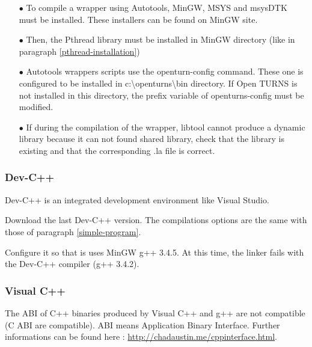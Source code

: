 \documentclass[11pt]{article}
\begin{document}
\begin{itemize}
\item[$\bullet$]   To compile a wrapper using Autotools, MinGW, MSYS and msysDTK must be installed. These installers can be found on MinGW site.

\item[$\bullet$]   Then, the Pthread library must be installed in MinGW directory (like in paragraph \ref{pthread-installation})

\item[$\bullet$]   Autotools wrappers scripts use the openturn-config command. These one is configured to be installed in c:\textbackslash openturns\textbackslash bin directory. If Open TURNS is not installed in this directory, the prefix variable of openturns-config must be modified.
\item[$\bullet$]   If during the compilation of the wrapper, libtool cannot produce a dynamic library because it can not found shared library, check that the library is existing and that the corresponding .la file is correct.
\end{itemize}


\subsubsection{Dev-C++}
Dev-C++ is an integrated development environment like Visual Studio.

Download the last Dev-C++ version.
The compilations options are the same with those of paragraph \ref{simple-program}.

Configure it so that is uses MinGW g++ 3.4.5. At this time, the linker fails with the Dev-C++ compiler (g++ 3.4.2).


\subsubsection{Visual C++}

The ABI of C++ binaries produced by Visual C++ and g++ are not compatible (C ABI are compatible). ABI means Application Binary Interface.
Further informations can be found here : \url{http://chadaustin.me/cppinterface.html}.
\end{document}

